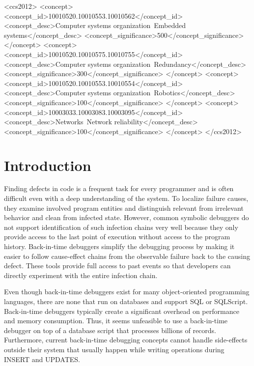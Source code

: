 \documentclass[english]{sig-alternate-05-2015}
\newcommand{\todo}[2][]{\pdfmargincomment[author={#1}]{#2}}
\begin{document}
%
%
\begin{CCSXML}
<ccs2012>
 <concept>
  <concept_id>10010520.10010553.10010562</concept_id>
  <concept_desc>Computer systems organization~Embedded systems</concept_desc>
  <concept_significance>500</concept_significance>
 </concept>
 <concept>
  <concept_id>10010520.10010575.10010755</concept_id>
  <concept_desc>Computer systems organization~Redundancy</concept_desc>
  <concept_significance>300</concept_significance>
 </concept>
 <concept>
  <concept_id>10010520.10010553.10010554</concept_id>
  <concept_desc>Computer systems organization~Robotics</concept_desc>
  <concept_significance>100</concept_significance>
 </concept>
 <concept>
  <concept_id>10003033.10003083.10003095</concept_id>
  <concept_desc>Networks~Network reliability</concept_desc>
  <concept_significance>100</concept_significance>
 </concept>
</ccs2012>  
\end{CCSXML}


\printccsdesc


\section{Introduction}

Finding defects in code is a frequent task for every programmer and is often difficult even with a deep understanding of the system.
To localize failure causes, they examine involved program entities and distinguish relevant from irrelevant behavior and clean from infected state. 
However, common symbolic debuggers do not support identification of such infection chains very well because they only provide access to the last point of execution without access to the program history.
Back-in-time debuggers simplify the debugging process \todo{cite} by making it easier to follow cause-effect chains from the observable failure back to the causing defect.
These tools provide full access to past events so that developers can directly experiment with the entire infection chain. 

Even though back-in-time debuggers exist for many object-oriented programming languages\todo{cite}, there are none that run on databases and support SQL or SQLScript.
Back-in-time debuggers typically create a significant overhead on performance and memory consumption\todo{cite}.
Thus, it seems unfeasible to use a back-in-time debugger on top of a database script that processes billions of records.
Furthermore, current back-in-time debugging concepts cannot handle side-effects outside their system that usually happen while writing operations during INSERT and UPDATES. 
\end{document}
